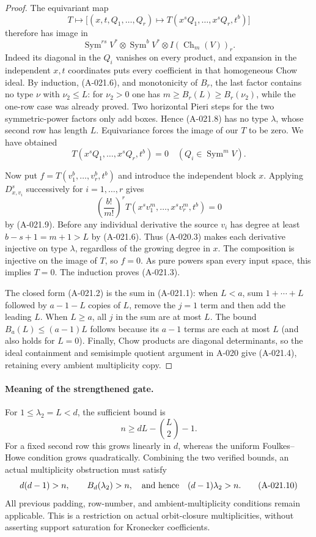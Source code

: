\begin{proof}
The equivariant map
\[
 T\longmapsto\bigl[(x,t,Q_1,\ldots,Q_r)\longmapsto
                         T(x^sQ_1,\ldots,x^sQ_r,t^b)\bigr]
\]
therefore has image in
\[
 \operatorname{Sym}^{rs}V^*\otimes\operatorname{Sym}^bV^*
                         \otimes I(\operatorname{Ch}_m(V))_r.
                                                               \tag{A-021.8}
\]
Indeed its diagonal in the $Q_i$ vanishes on every product,
and expansion in the independent $x,t$ coordinates puts every
coefficient in that homogeneous Chow ideal. By induction,
(A-021.6), and monotonicity of $B_r$, the last factor contains
no type $\nu$ with $\nu_2\leq L$: for $\nu_2>0$ one has
$m\geq B_r(L)\geq B_r(\nu_2)$, while the one-row case
was already proved. Two horizontal Pieri steps for the two
symmetric-power factors only add boxes. Hence (A-021.8) has
no type $\lambda$, whose second row has length $L$.
Equivariance forces the image of our $T$ to be zero. We have
obtained
\[
 T(x^sQ_1,\ldots,x^sQ_r,t^b)=0
                  \quad(Q_i\in\operatorname{Sym}^mV). \tag{A-021.9}
\]

Now put $f=T(v_1^b,\ldots,v_r^b,t^b)$ and introduce the
independent block $x$. Applying $D_{x,v_i}^s$ successively
for $i=1,\ldots,r$ gives
\[
 \left(\frac{b!}{m!}\right)^r
                  T(x^sv_1^m,\ldots,x^sv_r^m,t^b)=0
\]
by (A-021.9). Before any individual derivative the source
$v_i$ has degree at least $b-s+1=m+1>L$ by (A-021.6).
Thus (A-020.3) makes each derivative injective on type
$\lambda$, regardless of the growing degree in $x$.
The composition is injective on the image of $T$, so $f=0$.
As pure powers span every input space, this implies $T=0$.
The induction proves (A-021.3).

The closed form (A-021.2) is the sum in (A-021.1): when
$L<a$, sum $1+\cdots+L$ followed by $a-1-L$ copies of $L$,
remove the $j=1$ term and then add the leading $L$.
When $L\geq a$, all $j$ in the sum are at most $L$.
The bound $B_a(L)\leq(a-1)L$ follows because its $a-1$
terms are each at most $L$ (and also holds for $L=0$).
Finally, Chow products are diagonal determinants, so the
ideal containment and semisimple quotient argument in A-020
give (A-021.4), retaining every ambient multiplicity copy.
\end{proof}

\paragraph{Meaning of the strengthened gate.}
For $1\leq\lambda_2=L<d$, the sufficient bound is
\[
                          n\geq dL-\binom L2-1.
\]
For a fixed second row this grows linearly in $d$, whereas
the uniform Foulkes--Howe condition grows quadratically.
Combining the two verified bounds, an actual multiplicity
obstruction must satisfy
\[
        d(d-1)>n,\qquad B_d(\lambda_2)>n,
        \quad\hbox{and hence}\quad (d-1)\lambda_2>n.    \tag{A-021.10}
\]
All previous padding, row-number, and ambient-multiplicity
conditions remain applicable. This is a restriction on actual
orbit-closure multiplicities, without asserting support
saturation for Kronecker coefficients.

